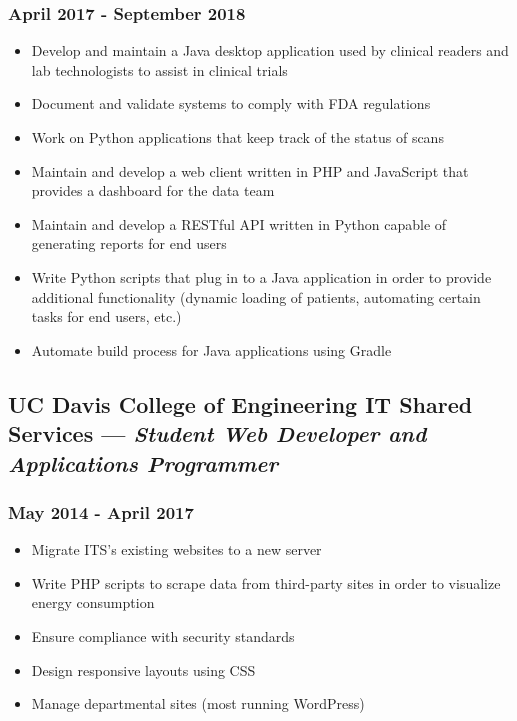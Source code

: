 \documentclass{article}
\begin{document}
\begin{minipage}[t]{.8\textwidth}
\subsubsection*{April 2017 - September 2018}
\parbox[t]{.5\textwidth}{\raggedright%
\begin{itemize}
\vspace{-1.5em}
	\item Develop and maintain a Java desktop application used by clinical readers and lab technologists to assist in clinical trials
	\item Document and validate systems to comply with FDA regulations
	\item Work on Python applications that keep track of the status of scans
	\item Maintain and develop a web client written in PHP and JavaScript that provides a dashboard for the data team
\end{itemize}}
\parbox[t]{.5\textwidth}{\raggedright%
\vspace{-1.5em}
\begin{itemize}
	\item Maintain and develop a RESTful API written in Python capable of generating reports for end users
	\item Write Python scripts that plug in to a Java application in order to provide additional functionality (dynamic loading of patients, automating certain tasks for end users, etc.)
	\item Automate build process for Java applications using Gradle
\end{itemize}}
\vspace{-1.5em}
\subsection*{UC Davis College of Engineering IT Shared Services --- \textit{Student Web Developer and Applications Programmer}}
\subsubsection*{May 2014 - April 2017}
\parbox[t]{.5\textwidth}{\raggedright%
\begin{itemize}
\vspace{-1.5em}
	\item Migrate ITS's existing websites to a new server
	\item Write PHP scripts to scrape data from third-party sites in order to visualize energy consumption
\end{itemize}}
\parbox[t]{.5\textwidth}{\raggedright%
\vspace{-1.5em}
\begin{itemize}
	\item Ensure compliance with security standards
	\item Design responsive layouts using CSS
	\item Manage departmental sites (most running WordPress)
\end{itemize}}

\end{minipage}
\end{document}
